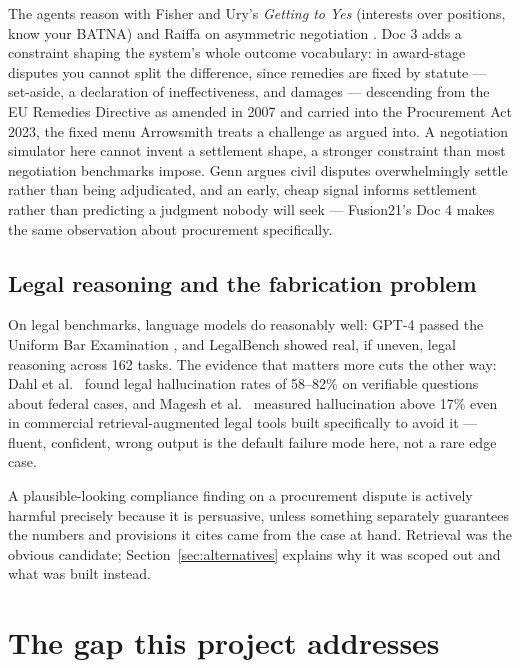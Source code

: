 The agents reason with Fisher and Ury's \emph{Getting to Yes}
\cite{fisher2011getting} (interests over positions, know your BATNA) and
Raiffa on asymmetric negotiation \cite{raiffa1982art}. Doc 3 adds a
constraint shaping the system's whole outcome vocabulary: in award-stage
disputes you cannot split the difference, since remedies are fixed by
statute --- set-aside, a declaration of ineffectiveness, and damages ---
descending from the EU Remedies Directive as amended in 2007
\cite{remediesdirective} and carried into the Procurement Act 2023, the
fixed menu Arrowsmith \cite{arrowsmith2014law} treats a challenge as argued
into. A negotiation simulator here cannot invent a settlement shape, a
stronger constraint than most negotiation benchmarks impose. Genn
\cite{genn2009judging} argues civil disputes overwhelmingly settle rather
than being adjudicated, and an early, cheap signal informs settlement
rather than predicting a judgment nobody will seek --- Fusion21's Doc 4
makes the same observation about procurement specifically.

\subsection*{Legal reasoning and the fabrication problem}

On legal benchmarks, language models do reasonably well: GPT-4 passed the
Uniform Bar Examination \cite{katz2024gpt4}, and LegalBench
\cite{guha2023legalbench} showed real, if uneven, legal reasoning across 162
tasks. The evidence that matters more cuts the other way: Dahl et al.\
\cite{dahl2024legal} found legal hallucination rates of 58--82\% on
verifiable questions about federal cases, and Magesh et al.\
\cite{magesh2024hallucination} measured hallucination above 17\% even in
commercial retrieval-augmented legal tools built specifically to avoid it
\cite{ji2023survey} --- fluent, confident, wrong output is the default
failure mode here, not a rare edge case.

A plausible-looking compliance finding on a procurement dispute is
actively harmful precisely because it is persuasive, unless something
separately guarantees the numbers and provisions it cites came from the
case at hand. Retrieval \cite{lewis2020rag} was the obvious candidate;
Section~\ref{sec:alternatives} explains why it was scoped out and what was
built instead.

\section{The gap this project addresses}
\label{sec:gap}

